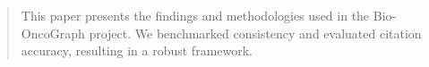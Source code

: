 \begin{abstract}
This paper presents the findings and methodologies used in the Bio-OncoGraph project. We benchmarked consistency and evaluated citation accuracy, resulting in a robust framework.
\end{abstract}
